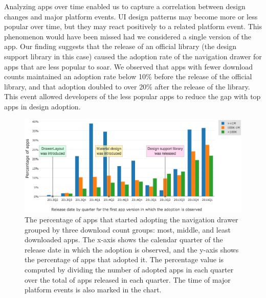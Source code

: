 Analyzing apps over time enabled us to capture a correlation between design changes and major platform events.
UI design patterns may become more or less popular over time, but they may react positively to a related platform event.
This phenomenon would have been missed had we considered a single version of the app.
Our finding suggests that the release of an official library (the design support library in this case) caused the adoption rate of the navigation drawer for apps that are less popular to soar.
We observed that apps with fewer download counts maintained an adoption rate below 10\% before the release of the official library, and that adoption doubled to over 20\% after the release of the library.
This event allowed developers of the less popular apps to reduce the gap with top apps in design adoption.
\begin{figure}[H]
	\includegraphics[scale=0.5]{figures/findings/navdrawer_by_quarter_grouped_by_downloads.png}
	\caption{The percentage of apps that started adopting the navigation drawer grouped by three download count groups: most, middle, and least downloaded apps. The x-axis shows the calendar quarter of the release date in which the adoption is observed, and the y-axis shows the percentage of apps that adopted it. The percentage value is computed by dividing the number of adopted apps in each quarter over the total of apps released in each quarter. The time of major platform events is also marked in the chart.}
	\label{fig:navdrawer_quarter_download}
\end{figure}

